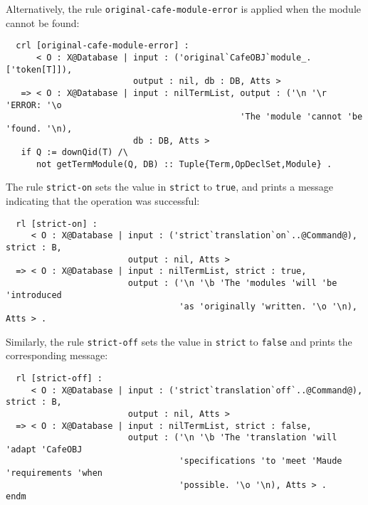 Alternatively, the rule \verb"original-cafe-module-error" is applied when
the module cannot be found:

{\codesize
\begin{verbatim}
  crl [original-cafe-module-error] :
      < O : X@Database | input : ('original`CafeOBJ`module_.['token[T]]),
                         output : nil, db : DB, Atts >
   => < O : X@Database | input : nilTermList, output : ('\n '\r 'ERROR: '\o
                                              'The 'module 'cannot 'be 'found. '\n),
                         db : DB, Atts >
   if Q := downQid(T) /\
      not getTermModule(Q, DB) :: Tuple{Term,OpDeclSet,Module} .
\end{verbatim}
}

The rule \verb"strict-on" sets the value in \verb"strict" to \verb"true", and
prints a message indicating that the operation was successful:


{\codesize
\begin{verbatim}
  rl [strict-on] :
     < O : X@Database | input : ('strict`translation`on`..@Command@), strict : B,
                        output : nil, Atts >
  => < O : X@Database | input : nilTermList, strict : true,
                        output : ('\n '\b 'The 'modules 'will 'be 'introduced
                                  'as 'originally 'written. '\o '\n), Atts > .
\end{verbatim}
}

Similarly, the rule \verb"strict-off" sets the value in \verb"strict" to \verb"false"
and prints the corresponding message:

{\codesize
\begin{verbatim}
  rl [strict-off] :
     < O : X@Database | input : ('strict`translation`off`..@Command@), strict : B,
                        output : nil, Atts >
  => < O : X@Database | input : nilTermList, strict : false,
                        output : ('\n '\b 'The 'translation 'will 'adapt 'CafeOBJ
                                  'specifications 'to 'meet 'Maude 'requirements 'when
                                  'possible. '\o '\n), Atts > .
endm
\end{verbatim}
}

